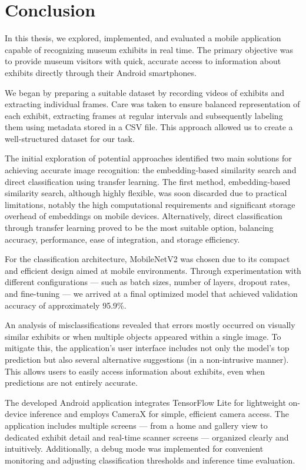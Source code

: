 \chapter*{Conclusion}

In this thesis, we explored, implemented, and evaluated a mobile application capable of recognizing museum exhibits in real time. The primary objective was to provide museum visitors with quick, accurate access to information about exhibits directly through their Android smartphones.

We began by preparing a suitable dataset by recording videos of exhibits and extracting individual frames. Care was taken to ensure balanced representation of each exhibit, extracting frames at regular intervals and subsequently labeling them using metadata stored in a CSV file. This approach allowed us to create a well-structured dataset for our task.

The initial exploration of potential approaches identified two main solutions for achieving accurate image recognition: the embedding-based similarity search and direct classification using transfer learning. The first method, embedding-based similarity search, although highly flexible, was soon discarded due to practical limitations, notably the high computational requirements and significant storage overhead of embeddings on mobile devices. Alternatively, direct classification through transfer learning proved to be the most suitable option, balancing accuracy, performance, ease of integration, and storage efficiency.

For the classification architecture, MobileNetV2 was chosen due to its compact and efficient design aimed at mobile environments. Through experimentation with different configurations --- such as batch sizes, number of layers, dropout rates, and fine-tuning --- we arrived at a final optimized model that achieved validation accuracy of approximately 95.9\%.

An analysis of misclassifications revealed that errors mostly occurred on visually similar exhibits or when multiple objects appeared within a single image. To mitigate this, the application's user interface includes not only the model's top prediction but also several alternative suggestions (in a non-intrusive manner). This allows users to easily access information about exhibits, even when predictions are not entirely accurate.

The developed Android application integrates TensorFlow Lite for lightweight on-device inference and employs CameraX for simple, efficient camera access. The application includes multiple screens --- from a home and gallery view to dedicated exhibit detail and real-time scanner screens --- organized clearly and intuitively. Additionally, a debug mode was implemented for convenient monitoring and adjusting classification thresholds and inference time evaluation.

